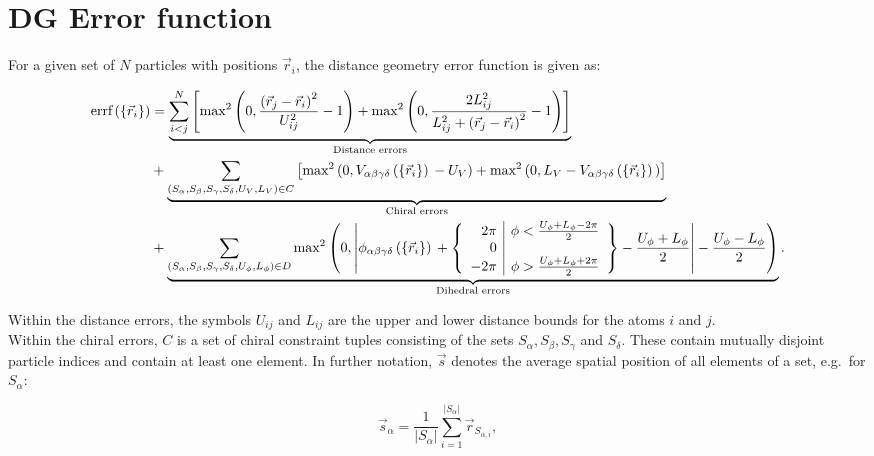 \documentclass[a4paper]{article}
\begin{document}
\newcommand{\volumeCalculationSub}[4]
{\posVecDiff{#1}{#4}^{T}
  \cdot \left[
    \posVecDiff{#2}{#4}
    \times\posVecDiff{#3}{#4}
  \right]
}

\newcommand{\volumeCalculation}[4]
{\left(\vec{#1}-\vec{#4} \right)^{T}
  \cdot \left[
    \left(\vec{#2}-\vec{#4} \right)
    \times\left(\vec{#3}-\vec{#4} \right)
  \right]
}

\newcommand{\partialPosVec}[1]
{\frac{\partial}{\partial\vec{r}_{#1}}}

\newcommand{\partialVec}[1]
{\frac{\partial}{\partial\vec{#1}\,}}

\newcommand{\errf}{\textrm{errf}\posDependence}

\section{DG Error function}

For a given set of $N$ particles with positions $\vec{r}_i$, the distance
geometry error function is given as:

\begin{align}\begin{aligned} %
  \errf &= \underbrace{\ijNSum \left[
      \distanceErrorFirstTerm{2} + \distanceErrorSecondTerm{2}
    \right]
  }_{\textrm{Distance errors}}\\
  &+ \underbrace{\chiralSum \left[ 
      \chiralErrorFirstTerm{2} + \chiralErrorSecondTerm{2}
    \right]
  }_{\textrm{Chiral errors}}\\
  &+ \underbrace{\dihedralSum \dihedralTerm{2}
  }_{\textrm{Dihedral errors}}.
\end{aligned}\end{align}

Within the distance errors, the symbols $U_{ij}$ and $L_{ij}$ are the upper and
lower distance bounds for the atoms $i$ and $j$.\\

Within the chiral errors, $C$ is a set of chiral constraint tuples consisting of
the sets $S_\alpha, S_\beta, S_\gamma$ and $S_\delta$. These contain mutually
disjoint particle indices and contain at least one element. In further notation,
$\vec{s}$ denotes the average spatial position of all elements of a set, e.g.\
for $S_\alpha$:

\begin{equation}
  \vec{s}_\alpha = \frac{1}{|S_\alpha|}\sum_{i=1}^{|S_\alpha|}
  \vec{r}_{S_{\alpha, i}},
\end{equation}
\end{document}
